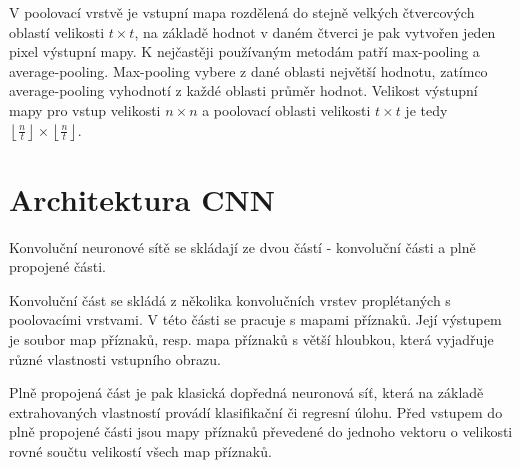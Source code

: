 V poolovací vrstvě je vstupní mapa rozdělená do stejně velkých čtvercových
oblastí velikosti $t \times t$, na základě hodnot v daném čtverci je pak
vytvořen jeden pixel výstupní mapy. K nejčastěji používaným metodám patří
max-pooling a average-pooling. Max-pooling vybere z dané oblasti největší
hodnotu, zatímco average-pooling vyhodnotí z každé oblasti průměr hodnot.
Velikost výstupní mapy pro vstup velikosti $n \times n$ a poolovací oblasti
velikosti $t \times t$ je tedy $\left\lfloor \frac{n}{t} \right\rfloor \times
    \left\lfloor \frac{n}{t} \right\rfloor$.

\section{Architektura CNN}

Konvoluční neuronové sítě se skládají ze dvou částí - konvoluční části a plně
propojené části.

Konvoluční část se skládá z několika konvolučních vrstev proplétaných s
poolovacími vrstvami. V této části se pracuje s mapami příznaků. Její výstupem
je soubor map příznaků, resp. mapa příznaků s větší hloubkou, která vyjadřuje
různé vlastnosti vstupního obrazu.

Plně propojená část je pak klasická dopředná neuronová síť, která na základě
extrahovaných vlastností provádí klasifikační či regresní úlohu. Před vstupem
do plně propojené části jsou mapy příznaků převedené do jednoho vektoru o
velikosti rovné součtu velikostí všech map příznaků.

\endinput
